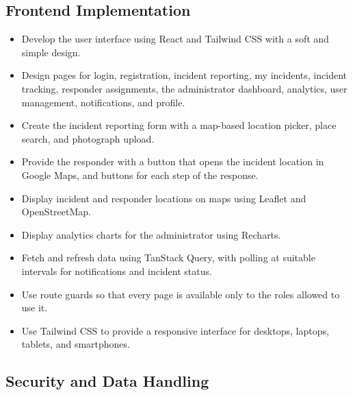 \documentclass[a4paper,12pt]{report}
\begin{document}
	\subsection{Frontend Implementation}
	
	\begin{itemize}
		\item Develop the user interface using React and Tailwind CSS with a soft and simple design.
		\item Design pages for login, registration, incident reporting, my incidents, incident tracking, responder assignments, the administrator dashboard, analytics, user management, notifications, and profile.
		\item Create the incident reporting form with a map-based location picker, place search, and photograph upload.
		\item Provide the responder with a button that opens the incident location in Google Maps, and buttons for each step of the response.
		\item Display incident and responder locations on maps using Leaflet and OpenStreetMap.
		\item Display analytics charts for the administrator using Recharts.
		\item Fetch and refresh data using TanStack Query, with polling at suitable intervals for notifications and incident status.
		\item Use route guards so that every page is available only to the roles allowed to use it.
		\item Use Tailwind CSS to provide a responsive interface for desktops, laptops, tablets, and smartphones.
	\end{itemize}
	
	\subsection{Security and Data Handling}
	
\end{document}
